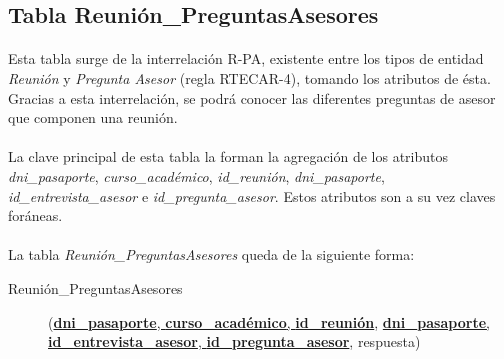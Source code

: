   \subsection{Tabla Reunión\_PreguntasAsesores}

      \paragraph{}Esta tabla surge de la interrelación R-PA, existente entre
      los tipos de entidad \textit{Reunión} y \textit{Pregunta Asesor}
      (regla RTECAR-4), tomando los atributos de ésta. Gracias a esta
      interrelación, se podrá conocer las diferentes preguntas de asesor que
      componen una reunión.

      \paragraph{}La clave principal de esta tabla la forman la agregación de
      los atributos \textit{dni\_pasaporte}, \textit{curso\_académico},
      \textit{id\_reunión}, \textit{dni\_pasaporte},
      \textit{id\_entrevista\_asesor} e \textit{id\_pregunta\_asesor}. Estos
      atributos son a su vez claves foráneas.

      \paragraph{}La tabla \textit{Reunión\_PreguntasAsesores} queda de la
      siguiente forma:

      \begin{description}
         \item[Reunión\_PreguntasAsesores] \begin{flushleft}(\underline{\textbf{dni\_pasaporte}, \textbf{curso\_académico},
         \textbf{id\_reunión}}, \underline{\textbf{dni\_pasaporte},
         \textbf{id\_entrevista\_asesor}, \textbf{id\_pregunta\_asesor}},
         respuesta)\end{flushleft}
      \end{description}